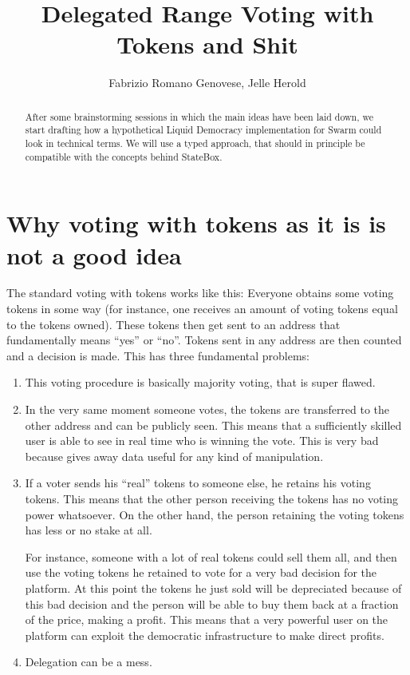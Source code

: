 \documentclass[submission, copyright,creativecommons,sharealike,noncommercial]{eptcs}
\title{Delegated Range Voting with Tokens and Shit}
\author{Fabrizio Romano Genovese, Jelle Herold
	\institute{Swarm Team}
	\email{fabrizio@swarm.com jelle@swarm.com}
}
\begin{document}
%	
	
	\maketitle

	\begin{abstract}
		After some brainstorming sessions in which the main ideas have been laid down, we start drafting how a hypothetical Liquid Democracy implementation for Swarm could look in technical terms. We will use a typed approach, that should in principle be compatible with the concepts behind StateBox.
	\end{abstract}

\section{Why voting with tokens as it is is not a good idea}
	The standard voting with tokens works like this: Everyone obtains some voting tokens in some way (for instance, one receives an amount of voting tokens equal to the tokens owned). These tokens then get sent to an address that fundamentally means ``yes'' or ``no''. Tokens sent in any address are then counted and a decision is made. This has three fundamental problems:
	\begin{enumerate}
		\item This voting procedure is basically majority voting, that is super flawed.
		\item In the very same moment someone votes, the tokens are transferred to the other address and can be publicly seen. This means that a sufficiently skilled user is able to see in real time who is winning the vote. This is very bad because gives away data useful for any kind of manipulation.
		\item If a voter sends his ``real'' tokens to someone else, he retains his voting tokens. This means that the other person receiving the tokens has no voting power whatsoever. On the other hand, the person retaining the voting tokens has less or no stake at all.
		
		For instance, someone with a lot of real tokens could sell them all, and then use the voting tokens he retained to vote for a very bad decision for the platform. At this point the tokens he just sold will be depreciated because of this bad decision and the person will be able to buy them back at a fraction of the price, making a profit. This means that a very powerful user on the platform can exploit the democratic infrastructure to make direct profits.
		
		\item Delegation can be a mess.
	\end{enumerate}
\end{document}
